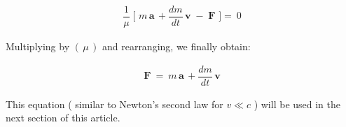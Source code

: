 \documentclass[10pt,fleqn]{article}
\begin{document}
\par \vspace{-0.60em}
\begin{eqnarray*}
\dfrac{1}{\mu} \; \bigg [ \,\, m \, \mathbf{a} \, + \dfrac{dm}{dt} \, \mathbf{v} \; - \; \mathbf{F} \,\, \bigg ] =~ 0
\end{eqnarray*}
\par \vspace{+0.60em}
\noindent Multiplying by $( \, \mu \, )$ and rearranging, we finally obtain:
\par \vspace{-0.45em}
\begin{eqnarray*}
\mathbf{F} ~=~ m \, \mathbf{a} \, + \dfrac{dm}{dt} \, \mathbf{v}
\end{eqnarray*}
\par \vspace{+0.60em}
\noindent This equation ( similar to Newton's second law for $v \ll c$ ) will be used in the next section of this article.

\newpage

\par {}

\bigskip \smallskip
\end{document}
